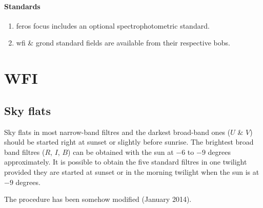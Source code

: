 \documentclass[11pt,fleqn]{book}
\newcounter{procedure}[chapter]
\begin{document}
\paragraph{Standards}
\begin{enumerate}
  \item \gls{feros} focus includes an optional spectrophotometric standard.
  \item \gls{wfi} \& \gls{grond} standard fields are available from their respective \glspl{bob}.
\end{enumerate}

\section{WFI}


\subsection{Sky flats}
\label{sec:wfiflats}
Sky flats in most narrow-band filtres and the darkest broad-band ones ($U$ \& $V$) should be started right at sunset or slightly before sunrise.  The brightest
broad band filtres ($R$, $I$, $B$) can be obtained with the sun at $-6$ to
$-9$ degrees approximately.  It is possible to obtain the five standard filtres in one twilight provided they are started at sunset or in the morning twilight when the sun is at $-9$ degrees.

The procedure has been somehow modified (January 2014).  
\end{document}
